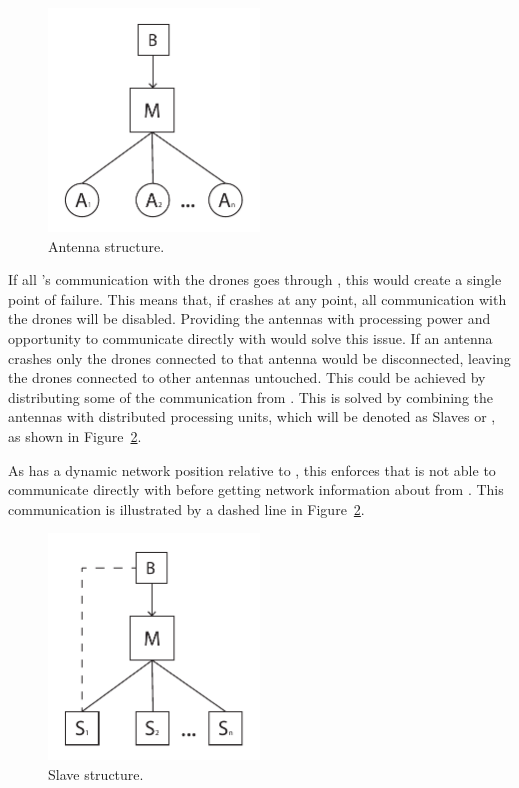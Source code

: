 \begin{figure}[htb]
    \centering
    \includegraphics[width=0.5\textwidth]{gfx/antenna_structure.pdf}
    \caption{Antenna structure.}
    \label{fig:antenna_structure}
\end{figure}

If all 's communication with the drones goes through , this would create a single point of failure.
This means that, if  crashes at any point, all communication with the drones will be disabled.
Providing the antennas with processing power and opportunity to communicate directly with  would solve this issue.
If an antenna crashes only the drones connected to that antenna would be disconnected, leaving the drones connected to other antennas untouched.
This could be achieved by distributing some of the communication from .
This is solved by combining the antennas with distributed processing units, which will be denoted as Slaves or , as shown in Figure~\ref{fig:slave_structure}.

As  has a dynamic network position relative to , this enforces that  is not able to communicate directly with  before getting network information about  from . This communication is illustrated by a dashed line in Figure~\ref{fig:slave_structure}.

\begin{figure}[htb]
    \centering
    \includegraphics[width=0.5\textwidth]{gfx/slave_structure.pdf}
    \caption{Slave structure.}
    \label{fig:slave_structure}
\end{figure}

